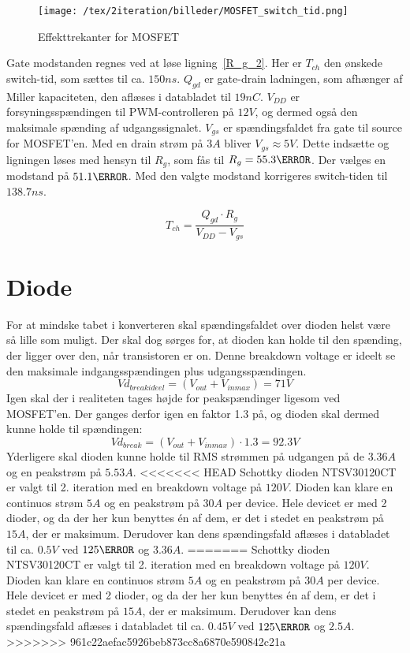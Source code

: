 \begin{figure}[H]
	\center
	\texttt{[image: /tex/2iteration/billeder/MOSFET\_switch\_tid.png]}
	\caption{Effekttrekanter for MOSFET}
	\label{fig:MOSFET_switch_tid}
\end{figure}

Gate modstanden regnes ved at løse ligning~\ref{R_g_2}. Her er $T_{ch}$ den ønskede switch-tid, som sættes til ca. $150ns$. $Q_{gd}$ er gate-drain ladningen, som afhænger af Miller kapaciteten, den aflæses i databladet til $19nC$. $V_{DD}$ er forsyningsspændingen til PWM-controlleren på $12V$, og dermed også den maksimale spænding af udgangssignalet. $V_{gs}$ er spændingsfaldet fra gate til source for MOSFET'en. Med en drain strøm på $3A$ bliver $V_{gs}\approx 5V$. Dette indsætte og ligningen løses med hensyn til $R_{g}$, som fås til $R_{g}=55.3\ohm$. Der vælges en modstand på $51.1\ohm$. Med den valgte modstand korrigeres switch-tiden til $138.7ns$.

\begin{equation} \label{R_g_2}
T_{ch} = \frac{Q_{gd} \cdot R_{g}}{V_{DD}-V_{gs}}
\end{equation}

\section{Diode}
For at mindske tabet i konverteren skal spændingsfaldet over dioden helst være så lille som muligt. Der skal dog sørges for, at dioden kan holde til den spænding, der ligger over den, når transistoren er on. Denne breakdown voltage er ideelt se den maksimale indgangsspændingen plus udgangsspændingen.
\begin{equation} \label{Vd_breakideel}
Vd_{breakideel} = (V_{out}+V_{inmax}) = 71V
\end{equation}
Igen skal der i realiteten tages højde for peakspændinger ligesom ved MOSFET'en. Der ganges derfor igen en faktor 1.3 på, og dioden skal dermed kunne holde til spændingen:
\begin{equation} \label{Vd_break}
Vd_{break} = (V_{out}+V_{inmax}) \cdot 1.3 = 92.3V
\end{equation}
Yderligere skal dioden kunne holde til RMS strømmen på udgangen på de $3.36A$ og en peakstrøm på $5.53A$.
<<<<<<< HEAD
Schottky dioden NTSV30120CT\cite{NTSV30120} er valgt til 2. iteration med en breakdown voltage på $120V$. Dioden kan klare en continuos strøm $5A$ og en peakstrøm på $30A$ per device. Hele devicet er med 2 dioder, og da der her kun benyttes én af dem, er det i stedet en peakstrøm på $15A$, der er maksimum. Derudover kan dens spændingsfald aflæses i databladet til ca. $0.5V$ ved $125\degreeCelsius$ og $3.36A$. 
=======
Schottky dioden NTSV30120CT er valgt til 2. iteration med en breakdown voltage på $120V$. Dioden kan klare en continuos strøm $5A$ og en peakstrøm på $30A$ per device. Hele devicet er med 2 dioder, og da der her kun benyttes én af dem, er det i stedet en peakstrøm på $15A$, der er maksimum. Derudover kan dens spændingsfald aflæses i databladet til ca. $0.45V$ ved $125\degreeCelsius$ og $2.5A$. 
>>>>>>> 961c22aefac5926beb873cc8a6870e590842c21a

